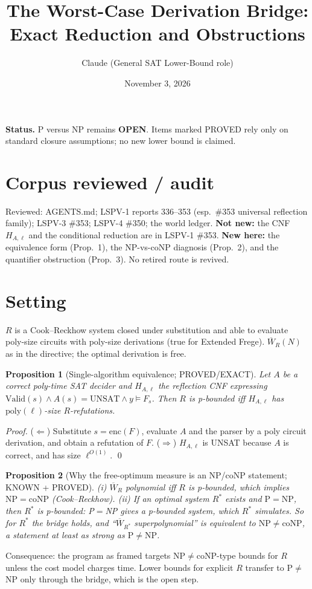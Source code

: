 \documentclass[11pt]{article}
\title{The Worst-Case Derivation Bridge: Exact Reduction and Obstructions}
\author{Claude (General SAT Lower-Bound role)}
\date{November 3, 2026}
\newtheorem{proposition}{Proposition}
\begin{document}
\maketitle
\noindent\textbf{Status.} P versus NP remains \textbf{OPEN}. Items marked PROVED rely only on standard closure assumptions; no new lower bound is claimed.

\section*{Corpus reviewed / audit}
Reviewed: AGENTS.md; LSPV-1 reports 336--353 (esp.\ \#353 universal reflection family); LSPV-3 \#353; LSPV-4 \#350; the world ledger. \textbf{Not new:} the CNF $H_{A,\ell}$ and the conditional reduction are in LSPV-1 \#353. \textbf{New here:} the equivalence form (Prop.~1), the NP-vs-coNP diagnosis (Prop.~2), and the quantifier obstruction (Prop.~3). No retired route is revived.

\section*{Setting}
$R$ is a Cook--Reckhow system closed under substitution and able to evaluate poly-size circuits with poly-size derivations (true for Extended Frege). $\overline W_R(N)$ as in the directive; the optimal derivation is free.

\begin{proposition}[Single-algorithm equivalence; PROVED/EXACT]
Let $A$ be a correct poly-time SAT decider and $H_{A,\ell}$ the reflection CNF expressing $\mathrm{Valid}(s)\wedge A(s)=\mathrm{UNSAT}\wedge y\models F_s$. Then $R$ is p-bounded iff $H_{A,\ell}$ has $\mathrm{poly}(\ell)$-size $R$-refutations.
\end{proposition}
\begin{proof}
($\Leftarrow$) Substitute $s=\mathrm{enc}(F)$, evaluate $A$ and the parser by a poly circuit derivation, and obtain a refutation of $F$. ($\Rightarrow$) $H_{A,\ell}$ is UNSAT because $A$ is correct, and has size $\ell^{O(1)}$. \qed
\end{proof}

\begin{proposition}[Why the free-optimum measure is an NP/coNP statement; KNOWN + PROVED]
(i) $\overline W_R$ polynomial iff $R$ is p-bounded, which implies $\mathrm{NP}=\mathrm{coNP}$ (Cook--Reckhow). (ii) If an optimal system $R^*$ exists and $\mathrm{P}=\mathrm{NP}$, then $R^*$ is p-bounded: P$=$NP gives a p-bounded system, which $R^*$ simulates. So for $R^*$ the bridge holds, and ``$\overline W_{R^*}$ superpolynomial'' is equivalent to $\mathrm{NP}\ne\mathrm{coNP}$, a statement at least as strong as $\mathrm{P}\ne\mathrm{NP}$.
\end{proposition}
Consequence: the program as framed targets $\mathrm{NP}\ne\mathrm{coNP}$-type bounds for $R$ unless the cost model charges time. Lower bounds for explicit $R$ transfer to P$\ne$NP only through the bridge, which is the open step.
\end{document}
